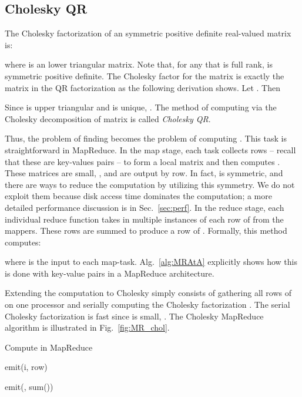 \documentclass[10pt, conference, compsocconf]{IEEEtran}
\begin{document}
\subsection{Cholesky QR}

The Cholesky factorization of an  symmetric positive definite real-valued matrix  is: 

where  is an  lower triangular matrix.  Note that, for any  that is full rank,  is symmetric positive definite.  The Cholesky factor  for the matrix  is exactly the matrix  in the QR factorization as the following derivation shows.  Let .  Then

Since  is upper triangular and  is unique, .  The method of computing  via the Cholesky decomposition of  matrix is called \emph{Cholesky QR}.

Thus, the problem of finding  becomes the problem of computing .  This task is straightforward in MapReduce.  In the map stage, each task collects rows -- recall that these are key-values pairs -- to form a local matrix  and then computes .  These matrices are small, , and are output by row.  In fact,  is symmetric, and there are ways to reduce the computation by utilizing this symmetry. We do not exploit them because disk access time dominates the computation; a more detailed performance discussion is in Sec.~\ref{sec:perf}.
In the reduce stage, each individual reduce function takes in multiple instances of each row of  from the mappers.  These rows are summed to produce a row of .  Formally, this method computes: 

where  is the input to each map-task.
Alg.~\ref{alg:MRAtA} explicitly shows how this is done with key-value pairs in a MapReduce architecture.

Extending the  computation to Cholesky  simply consists of gathering all rows of  on one processor and serially computing the Cholesky factorization .  The serial Cholesky factorization is fast since  is small, .  The Cholesky  MapReduce algorithm is illustrated in Fig.~\ref{fig:MR_chol}.

\begin{algorithm}
  \caption{Compute  in MapReduce}
  \label{alg:MRAtA}
  \begin{algorithmic}
     \State emit(i, row)
    \EndFor
  \EndFunction

  \vspace{0.1in}

    \State emit(, sum())
  \EndFunction
  
  \end{algorithmic}
\end{algorithm}
\end{document}
